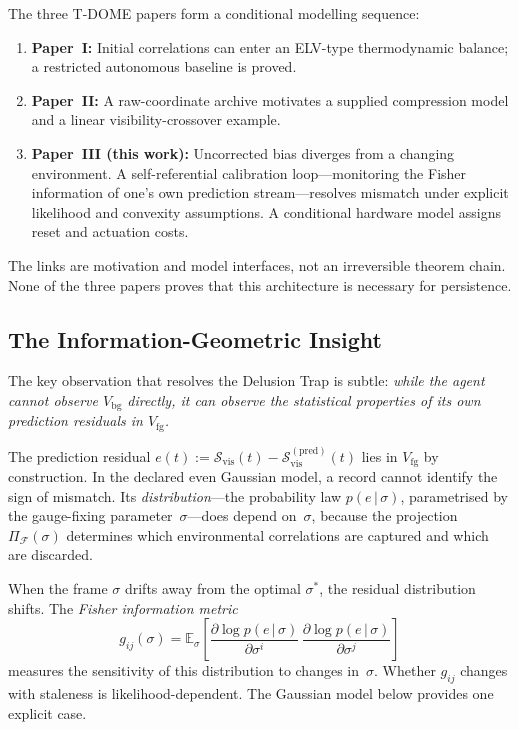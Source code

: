 \documentclass[12pt]{article}
\begin{document}
The three T-DOME papers form a conditional modelling sequence:
\begin{enumerate}
\item \textbf{Paper~I:} Initial correlations can enter an ELV-type
  thermodynamic balance; a restricted autonomous baseline is proved.
\item \textbf{Paper~II:} A raw-coordinate archive motivates a supplied
  compression model and a linear visibility-crossover example.
\item \textbf{Paper~III (this work):} Uncorrected
  bias diverges from a changing environment.
  A self-referential calibration loop---monitoring the
  Fisher information of one's own prediction stream---resolves
  mismatch under explicit likelihood and convexity assumptions.  A
  conditional hardware model assigns reset and actuation costs.
\end{enumerate}

The links are motivation and model interfaces, not an irreversible
theorem chain.  None of the three papers proves that this architecture
is necessary for persistence.

\subsection{The Information-Geometric Insight}
\label{subsec:insight}

The key observation that resolves the Delusion Trap is
subtle:
\emph{while the agent cannot observe $V_{\mathrm{bg}}$
directly, it can observe the statistical properties of its
own prediction residuals in $V_{\mathrm{fg}}$.}

The prediction residual
$e(t) := \mathcal{S}_{\mathrm{vis}}(t)
- \mathcal{S}_{\mathrm{vis}}^{(\mathrm{pred})}(t)$
lies in $V_{\mathrm{fg}}$ by construction.
In the declared even Gaussian model, a record cannot identify the sign
of mismatch.  Its \emph{distribution}---the probability law
$p(e\,|\,\sigma)$, parametrised by the gauge-fixing
parameter~$\sigma$---does depend on~$\sigma$, because the
projection $\Pi_{\mathcal{F}}(\sigma)$ determines which
environmental correlations are captured and which are
discarded.

When the frame $\sigma$ drifts away from the optimal
$\sigma^*$, the residual distribution shifts.
The \emph{Fisher information metric}
\begin{equation}
\label{eq:fisher_preview}
g_{ij}(\sigma)
= \mathbb{E}_\sigma\!\left[
  \frac{\partial \log p(e\,|\,\sigma)}
       {\partial \sigma^i}\,
  \frac{\partial \log p(e\,|\,\sigma)}
       {\partial \sigma^j}
\right]
\end{equation}
measures the sensitivity of this distribution to changes
in~$\sigma$.
Whether $g_{ij}$ changes with staleness is likelihood-dependent.  The
Gaussian model below provides one explicit case.
\end{document}
